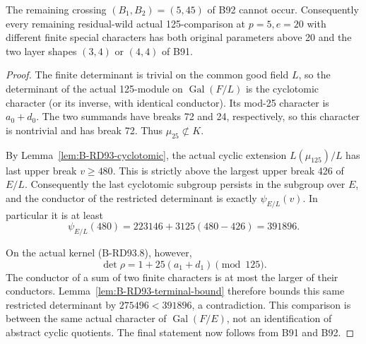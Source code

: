 \begin{theorem}
\label{thm:B-RD93-crossing}
The remaining crossing \((B_1,B_2)=(5,45)\) of B92 cannot
occur. Consequently every remaining residual-wild actual
125-comparison at \(p=5,e=20\) with different finite special
characters has both original parameters above 20 and the
two layer shapes \((3,4)\) or \((4,4)\) of B91.
\end{theorem}
\begin{proof}
The finite determinant is trivial on the common good field
\(L\), so the determinant of the actual 125-module on
\(\operatorname{Gal}(F/L)\) is the cyclotomic character
(or its inverse, with identical conductor). Its mod-25
character is \(a_0+d_0\). The two summands have breaks
72 and 24, respectively, so this character is nontrivial
and has break 72. Thus \(\mu _{25}\not\subset K\).

By Lemma~\ref{lem:B-RD93-cyclotomic}, the actual cyclic
extension \(L(\mu _{125})/L\) has last upper break
\(v\ge480\). This is strictly above the largest upper
break 426 of \(E/L\). Consequently the last cyclotomic
subgroup persists in the subgroup over \(E\), and the
conductor of the restricted determinant is exactly
\(\psi_{E/L}(v)\). In particular it is at least
\[
 \psi_{E/L}(480)=223146+3125(480-426)=391896.             \tag{B-RD93.16}
\]

On the actual kernel (B-RD93.8), however,
\[
                  \det\rho=1+25(a_1+d_1)\pmod {125}.
\]
The conductor of a sum of two finite characters is at most
the larger of their conductors. Lemma~\ref{lem:B-RD93-terminal-bound}
therefore bounds this same restricted determinant by
\(275496<391896\), a contradiction. This comparison is
between the same actual character of \(\operatorname{Gal}(F/E)\),
not an identification of abstract cyclic quotients.
The final statement now follows from B91 and B92.
\end{proof}

